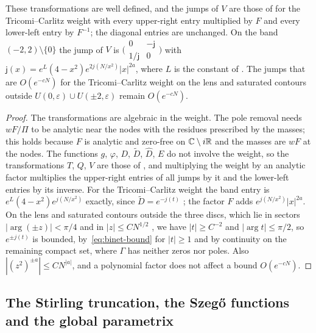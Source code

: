 \begin{lemma}\label{lem:pone-weight}
These transformations are well defined, and the jumps of $V$ are those of \cite[\S5]{WLXZ} for the Tricomi--Carlitz
weight with every upper-right entry multiplied by $F$ and every lower-left entry by $F^{-1}$; the diagonal entries are
unchanged. On the band $(-2,2)\setminus\{0\}$ the jump of $V$ is
$\bigl(\begin{smallmatrix}0&-\mathsf j\\1/\mathsf j&0\end{smallmatrix}\bigr)$ with
$\mathsf j(x)=e^L(4-x^2)e^{2j(N/x^2)}|x|^{2a}$, where $L$ is the constant of \cite[(5.9)]{WLXZ}. The jumps that are
$O(e^{-cN})$ for the Tricomi--Carlitz weight on the lens and saturated contours outside $U(0,\varepsilon)\cup
U(\pm2,\varepsilon)$ remain $O(e^{-cN})$.
\end{lemma}

\begin{proof}
The transformations are algebraic in the weight. The pole removal \cite[(3.9)--(3.12)]{WLXZ} needs $wF/\Pi$ to be analytic
near the nodes with the residues prescribed by the masses; this holds because $F$ is analytic and zero-free on
$\mathbb{C}\setminus i\mathbb{R}$ and the masses are $wF$ at the nodes. The functions $g$, $\varphi$, $D$, $\tilde D$, $\hat D$, $E$ do not
involve the weight, so the transformations $T$, $Q$, $V$ are those of \cite{WLXZ}, and multiplying the weight by an analytic
factor multiplies the upper-right entries of all jumps by it and the lower-left entries by its inverse. For the
Tricomi--Carlitz weight the band entry is $e^L(4-x^2)e^{j(N/x^2)}$ exactly, since $\tilde D=e^{-j(t)}$
\cite[(2.15), (3.4), (3.7), (4.15), (4.24)]{WLXZ}; the factor $F$ adds $e^{j(N/x^2)}|x|^{2a}$. On the lens and
saturated contours outside the three discs, which lie in sectors $|\arg(\pm z)|<\pi/4$ and in $|z|\le CN^{1/2}$
\cite[(3.2)]{WLXZ}, we have $|t|\ge C^{-2}$ and $|\arg t|\le\pi/2$, so $e^{\pm j(t)}$ is bounded, by~\eqref{eq:binet-bound}
for $|t|\ge1$ and by continuity on the remaining compact set, where $\Gamma$ has neither zeros nor poles. Also
$|(z^2)^{\pm a}|\le CN^{|a|}$, and a polynomial factor does not affect a bound $O(e^{-cN})$.
\end{proof}

\subsection{The Stirling truncation, the Szeg\H{o} functions and the global parametrix}\label{app:pone-global}

